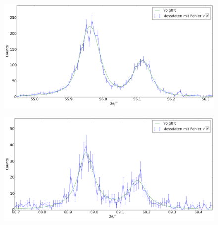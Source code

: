 \begin{figure}[H]
\begin{minipage}{.52\textwidth}
  \centering
  \includegraphics[scale=0.18]{messung_pulver_3}
  \label{fig:pul_mess_3}
\end{minipage}
\hspace{0.2cm}
\begin{minipage}{.52\textwidth}
  \centering
  \includegraphics[scale=0.18]{messung_pulver_4}
  \label{fig:pul_mess_4}
\end{minipage}
\end{figure}
